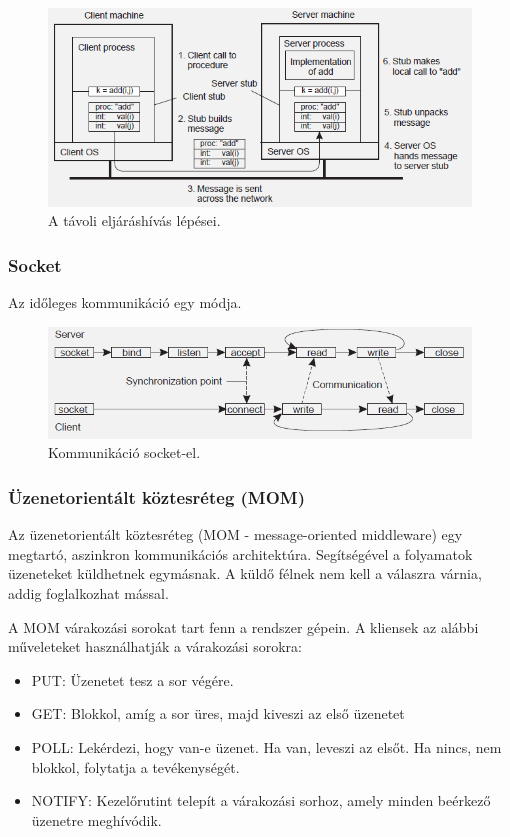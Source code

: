 \documentclass[margin=0px]{article}
\begin{document}
	\begin{figure}[H]
		\centering
		\includegraphics[width=0.8\linewidth]{img/rpc}
		\caption{A távoli eljáráshívás lépései.}
		\label{fig:rpc}
	\end{figure}
	
	\subsubsection{Socket}
	
	Az időleges kommunikáció egy módja.
	
	\begin{figure}[H]
		\centering
		\includegraphics[width=0.8\linewidth]{img/socket}
		\caption{Kommunikáció socket-el.}
		\label{fig:socket}
	\end{figure}
	
	\subsubsection{Üzenetorientált köztesréteg (MOM)}
	
	Az üzenetorientált köztesréteg (MOM - message-oriented middleware) egy megtartó, aszinkron kommunikációs architektúra.
	Segítségével a folyamatok üzeneteket küldhetnek egymásnak. A küldő félnek nem kell a válaszra várnia, addig
	foglalkozhat mással.
	
	A MOM várakozási sorokat tart fenn a rendszer gépein. A kliensek az alábbi műveleteket
	használhatják a várakozási sorokra:
	
	\begin{itemize}
		\item	PUT: Üzenetet tesz a sor végére.
		\item	GET: Blokkol, amíg a sor üres, majd kiveszi az első üzenetet
		\item	POLL: Lekérdezi, hogy van-e üzenet. Ha van, leveszi az elsőt.
		Ha nincs, nem blokkol, folytatja a tevékenységét.
		\item	NOTIFY: Kezelőrutint telepít a várakozási sorhoz, amely minden
		beérkező üzenetre meghívódik.
	\end{itemize}
	
\end{document}
